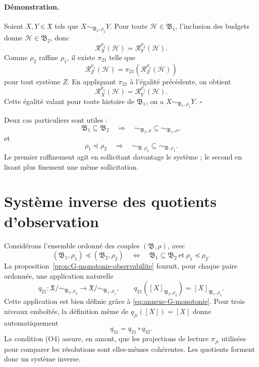 \paragraph{Démonstration.}
Soient \(X,Y\in\mathfrak X\) tels que
\(X\sim_{\mathfrak B_2,\rho_2}Y\). Pour toute
\(\mathcal H\in\mathfrak B_1\), l'inclusion des budgets donne
\(\mathcal H\in\mathfrak B_2\), donc
\[
\mathcal R_X^{\rho_2}(\mathcal H)
=
\mathcal R_Y^{\rho_2}(\mathcal H).
\]
Comme \(\rho_2\) raffine \(\rho_1\), il existe \(\pi_{21}\) telle que
\[
\mathcal R_Z^{\rho_1}(\mathcal H)
=
\pi_{21}\!\left(
\mathcal R_Z^{\rho_2}(\mathcal H)
\right)
\]
pour tout système \(Z\). En appliquant \(\pi_{21}\) à l'égalité
précédente, on obtient
\[
\mathcal R_X^{\rho_1}(\mathcal H)
=
\mathcal R_Y^{\rho_1}(\mathcal H).
\]
Cette égalité valant pour toute histoire de \(\mathfrak B_1\), on a
\(X\sim_{\mathfrak B_1,\rho_1}Y\).
\hfill\(\square\)

Deux cas particuliers sont utiles :
\[
\mathfrak B_1\subseteq\mathfrak B_2
\quad\Longrightarrow\quad
\sim_{\mathfrak B_2,\rho}
\subseteq
\sim_{\mathfrak B_1,\rho},
\]
et
\[
\rho_1\preceq\rho_2
\quad\Longrightarrow\quad
\sim_{\mathfrak B,\rho_2}
\subseteq
\sim_{\mathfrak B,\rho_1}.
\]
Le premier raffinement agit en sollicitant davantage le système ; le
second en lisant plus finement une même sollicitation.

\section{Système inverse des quotients d'observation}
\label{annexe-histoires-systeme-inverse}

Considérons l'ensemble ordonné des couples \((\mathfrak B,\rho)\), avec
\begin{equation}
\label{eq:annexe-G-ordre-produit}
(\mathfrak B_1,\rho_1)
\preceq
(\mathfrak B_2,\rho_2)
\quad\Longleftrightarrow\quad
\mathfrak B_1\subseteq\mathfrak B_2
\ \text{et}\ 
\rho_1\preceq\rho_2.
\end{equation}
La proposition~\ref{prop:G-monotonie-observabilite} fournit, pour chaque paire ordonnée, une
application naturelle
\begin{equation}
\label{eq:annexe-G-projection-quotients}
q_{21}:
\mathfrak X/{\sim_{\mathfrak B_2,\rho_2}}
\longrightarrow
\mathfrak X/{\sim_{\mathfrak B_1,\rho_1}},
\qquad
q_{21}\!\left([X]_{\mathfrak B_2,\rho_2}\right)
=
[X]_{\mathfrak B_1,\rho_1}.
\end{equation}
Cette application est bien définie grâce à
\eqref{eq:annexe-G-monotonie}. Pour trois niveaux emboîtés, la
définition même de \(q_{ji}([X])=[X]\) donne automatiquement
\[
q_{31}=q_{21}\circ q_{32}.
\]
La condition (O4) assure, en amont, que les projections de lecture
\(\pi_{ji}\) utilisées pour comparer les résolutions sont elles-mêmes
cohérentes. Les quotients forment donc un système inverse.

